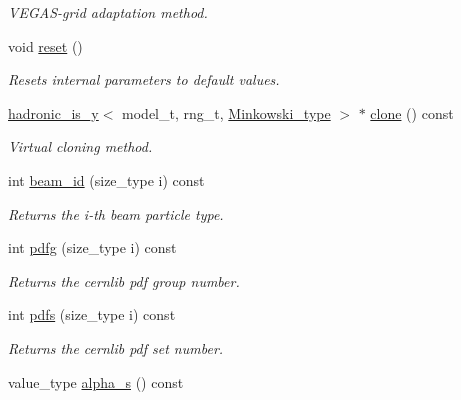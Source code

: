 \begin{DoxyCompactItemize}
\begin{DoxyCompactList}\small\item\em V\+E\+G\+A\+S-\/grid adaptation method. \end{DoxyCompactList}\item 
\hypertarget{a00263_a0b504d75eb09425456b2d27af5f2c71b}{}void \hyperlink{a00263_a0b504d75eb09425456b2d27af5f2c71b}{reset} ()\label{a00263_a0b504d75eb09425456b2d27af5f2c71b}

\begin{DoxyCompactList}\small\item\em Resets internal parameters to default values. \end{DoxyCompactList}\item 
\hypertarget{a00263_a2aa3b526cc526742df0ac5159788e1a1}{}\hyperlink{a00262}{hadronic\+\_\+is\+\_\+y}$<$ model\+\_\+t, rng\+\_\+t, \hyperlink{a00371}{Minkowski\+\_\+type} $>$ $\ast$ \hyperlink{a00263_a2aa3b526cc526742df0ac5159788e1a1}{clone} () const \label{a00263_a2aa3b526cc526742df0ac5159788e1a1}

\begin{DoxyCompactList}\small\item\em Virtual cloning method. \end{DoxyCompactList}\item 
\hypertarget{a00263_a77ab576fbb1779f2247caa69597b5b94}{}int \hyperlink{a00263_a77ab576fbb1779f2247caa69597b5b94}{beam\+\_\+id} (size\+\_\+type i) const \label{a00263_a77ab576fbb1779f2247caa69597b5b94}

\begin{DoxyCompactList}\small\item\em Returns the i-\/th beam particle type. \end{DoxyCompactList}\item 
\hypertarget{a00263_a4d73ff387bd178cac4b0e41e64c63236}{}int \hyperlink{a00263_a4d73ff387bd178cac4b0e41e64c63236}{pdfg} (size\+\_\+type i) const \label{a00263_a4d73ff387bd178cac4b0e41e64c63236}

\begin{DoxyCompactList}\small\item\em Returns the cernlib pdf group number. \end{DoxyCompactList}\item 
\hypertarget{a00263_a2d4c104dbb41559ee91885ddd929486f}{}int \hyperlink{a00263_a2d4c104dbb41559ee91885ddd929486f}{pdfs} (size\+\_\+type i) const \label{a00263_a2d4c104dbb41559ee91885ddd929486f}

\begin{DoxyCompactList}\small\item\em Returns the cernlib pdf set number. \end{DoxyCompactList}\item 
\hypertarget{a00263_a0e13cd819cced05ee42aecc180eb9810}{}value\+\_\+type \hyperlink{a00263_a0e13cd819cced05ee42aecc180eb9810}{alpha\+\_\+s} () const \label{a00263_a0e13cd819cced05ee42aecc180eb9810}


\end{DoxyCompactItemize}
